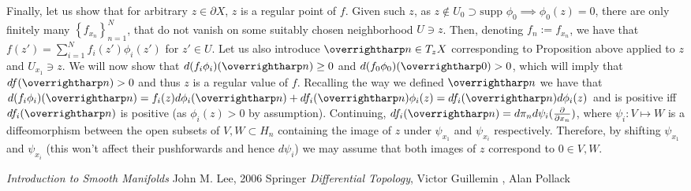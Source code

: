 \documentclass[8pt]{article} %
\begin{document}
\begin{enumerate}[label=\bfseries \arabic*.]
{		Finally, let us show that for arbitrary $z\in\partial X$, $z$ is a regular point of $f$. Given such $z$, as
		$z\notin U_0\supset\mbox{supp }\phi_0\implies \phi_0(z)=0$, there are only finitely many $\left\{
		f_{x_n}\right\}_{n=1}^N$, that do not vanish on some suitably chosen neighborhood $U\ni z$. Then,
		denoting $f_n:=f_{x_n}$, we have that
		$f(z')=\sum_{i=1}^N f_i(z')\phi_i(z')$ for $z'\in U$.
		Let us also introduce $\myvec{n}\in T_z X$ corresponding to Proposition above applied to $z$ and $U_{x_1}\ni z$. 
		We will now show that $d(f_i\phi_i)(\myvec{n})\geq 0$ and $d(f_0\phi_0)(\myvec{0})>0$, which will
		imply that $df(\myvec{n})>0$ and thus $z$ is a regular value of $f$. Recalling the way we defined $\myvec{n}$ we
		have that $d(f_i\phi_i)(\myvec{n})=f_i(z)d\phi_i(\myvec{n})+df_i(\myvec{n})\phi_i(z)=df_i(\myvec{n})d\phi_i(z)$
		and is positive iff $df_i(\myvec{n})$ is positive (as $\phi_i(z)>0$ by assumption).
		Continuing, $df_i(\myvec{n})=d\pi_n d\psi_i(\frac{\partial}{\partial x_n})$, where $\psi_i:V\mapsto W$
		 is a diffeomorphism
		 between the open subsets of $V,W\subset H_n$ containing the image of $z$ under $\psi_{x_1}$ and
		 $\psi_{x_i}$ respectively. Therefore, by shifting $\psi_{x_1}$ and $\psi_{x_i}$ (this won't affect
		 their pushforwards and hence $d\psi_i$) we may assume that both images of $z$ correspond to $0\in V,W$. 
		
			}
\end{enumerate}
\begin{thebibliography}{9}
	 {\em Introduction to Smooth Manifolds} John M. Lee, 2006 Springer
	 {\em Differential Topology}, Victor Guillemin , Alan Pollack
\end{thebibliography}
\end{document}
